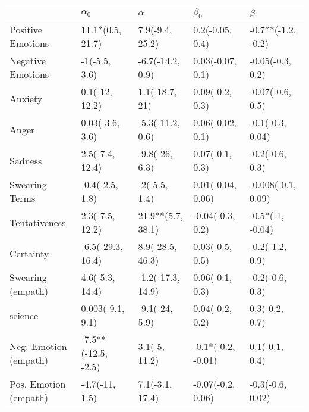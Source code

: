 \begin{tabular}{lllll}
\toprule
{} &           $\alpha_0$ &           $\alpha$ &           $\beta_0$ &             $\beta$ \\
\midrule
Positive Emotions     &     11.1*(0.5, 21.7) &    7.9(-9.4, 25.2) &     0.2(-0.05, 0.4) &  -0.7**(-1.2, -0.2) \\
Negative Emotions     &        -1(-5.5, 3.6) &   -6.7(-14.2, 0.9) &    0.03(-0.07, 0.1) &    -0.05(-0.3, 0.2) \\
Anxiety               &       0.1(-12, 12.2) &     1.1(-18.7, 21) &     0.09(-0.2, 0.3) &    -0.07(-0.6, 0.5) \\
Anger                 &      0.03(-3.6, 3.6) &   -5.3(-11.2, 0.6) &    0.06(-0.02, 0.1) &    -0.1(-0.3, 0.04) \\
Sadness               &      2.5(-7.4, 12.4) &     -9.8(-26, 6.3) &     0.07(-0.1, 0.3) &     -0.2(-0.6, 0.3) \\
Swearing Terms        &      -0.4(-2.5, 1.8) &      -2(-5.5, 1.4) &   0.01(-0.04, 0.06) &  -0.008(-0.1, 0.09) \\
Tentativeness         &      2.3(-7.5, 12.2) &  21.9**(5.7, 38.1) &    -0.04(-0.3, 0.2) &    -0.5*(-1, -0.04) \\
Certainty             &    -6.5(-29.3, 16.4) &   8.9(-28.5, 46.3) &     0.03(-0.5, 0.5) &     -0.2(-1.2, 0.9) \\
Swearing (empath)     &      4.6(-5.3, 14.4) &  -1.2(-17.3, 14.9) &     0.06(-0.1, 0.3) &     -0.2(-0.6, 0.3) \\
science               &     0.003(-9.1, 9.1) &     -9.1(-24, 5.9) &     0.04(-0.2, 0.2) &      0.3(-0.2, 0.7) \\
Neg. Emotion (empath) &  -7.5**(-12.5, -2.5) &      3.1(-5, 11.2) &  -0.1*(-0.2, -0.01) &      0.1(-0.1, 0.4) \\
Pos. Emotion (empath) &       -4.7(-11, 1.5) &    7.1(-3.1, 17.4) &   -0.07(-0.2, 0.06) &    -0.3(-0.6, 0.02) \\
\bottomrule
\end{tabular}
